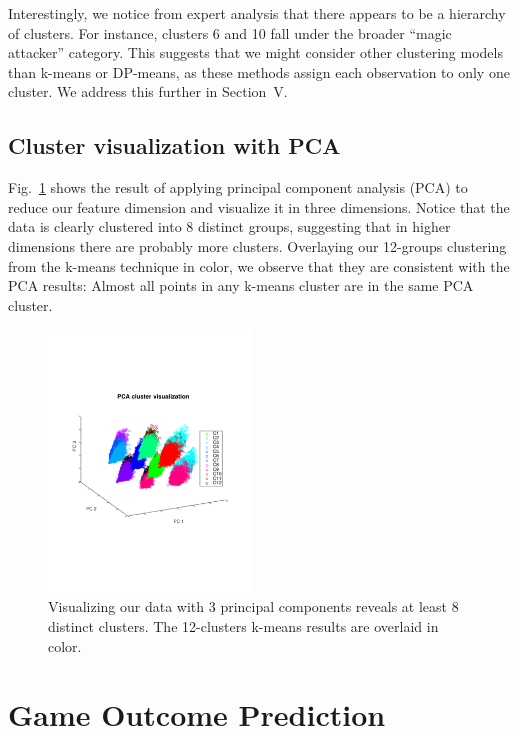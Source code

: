 \documentclass[letterpaper,10 pt,conference]{ieeeconf}
\begin{document}
Interestingly, we notice from expert analysis that there appears to be a hierarchy of clusters. For instance, clusters 6 and 10 fall under the broader ``magic attacker'' category. This suggests that we might consider other clustering models than k-means or DP-means, as these methods assign each observation to only one cluster. We address this further in Section~V.

\subsection{Cluster visualization with PCA}

Fig.~\ref{fig:viz} shows the result of applying principal component analysis (PCA) to reduce our feature dimension and visualize it in three dimensions. Notice that the data is clearly clustered into 8 distinct groups, suggesting that in higher dimensions there are probably more clusters. Overlaying our 12-groups clustering from the k-means technique in color, we observe that they are consistent with the PCA results: Almost all points in any k-means cluster are in the same PCA cluster. 

\begin{figure}[htbp!]
  \centering
  \includegraphics[trim=70pt 210pt 70pt 250pt, clip, width=0.48\textwidth]{viz-cluster.pdf}
  \caption{Visualizing our data with 3 principal components reveals at least 8 distinct clusters. The 12-clusters k-means results are overlaid in color.}
  \label{fig:viz}
\end{figure}

\section{Game Outcome Prediction}
\end{document}
